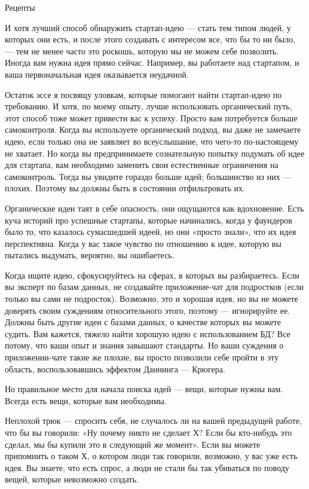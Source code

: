 \documentclass[ebook,12pt,oneside,openany]{memoir}
\begin{document}
Рецепты

И хотя лучший способ обнаружить стартап-идею — стать тем типом людей,
у которых они есть, и после этого создавать с интересом все, что бы то
ни было, — тем не менее часто это роскошь, которую мы не можем себе
позволить. Иногда вам нужна идея прямо сейчас. Например, вы работаете
над стартапом, и ваша первоначальная идея оказывается неудачной.

Остаток эссе я посвящу уловкам, которые помогают найти стартап-идею по
требованию. И хотя, по моему опыту, лучше использовать органический
путь, этот способ тоже может привести вас к успеху. Просто вам
потребуется больше самоконтроля. Когда вы используете органический
подход, вы даже не замечаете идею, если только она не заявляет во
всеуслышание, что чего-то по-настоящему не хватает. Но когда вы
предпринимаете сознательную попытку подумать об идее для стартапа, вам
необходимо заменить свои естественные ограничения на самоконтроль.
Тогда вы увидите гораздо больше идей; большинство из них — плохих.
Поэтому вы должны быть в состоянии отфильтровать их.

Органические идеи таят в себе опасность, они ощущаются как
вдохновение. Есть куча историй про успешные стартапы, которые
начинались, когда у фаундеров было то, что казалось сумасшедшей идеей,
но они «просто знали», что их идея перспективна. Когда у вас такое
чувство по отношению к идее, которую вы пытались выдумать, вероятно,
вы ошибаетесь.

Когда ищите идею, сфокусируйтесь на сферах, в которых вы разбираетесь.
Если вы эксперт по базам данных, не создавайте приложение-чат для
подростков (если только вы сами не подросток). Возможно, это и хорошая
идея, но вы не можете доверять своим суждениям относительного этого,
поэтому — игнорируйте ее. Должны быть другие идеи с базами данных, о
качестве которых вы можете судить. Вам кажется, тяжело найти хорошую
идею с использованием БД? Все потому, что ваши опыт и знания завышают
стандарты. Но ваши суждения о приложении-чате такие же плохие, вы
просто позволили себе пройти в эту область, воспользовавшись эффектом
Даннинга — Крюгера.

Но правильное место для начала поиска идей — вещи, которые нужны вам.
Всегда есть вещи, которые вам необходимы.

Неплохой трюк — спросить себя, не случалось ли на вашей предыдущей
работе, что бы вы говорили: «Ну почему никто не сделает Х? Если бы
кто-нибудь это сделал, мы бы купили это в следующий же момент». Если
вы можете припомнить о таком Х, о котором люди так говорили, возможно,
у вас уже есть идея. Вы знаете, что есть спрос, а люди не стали бы так
убиваться по поводу вещей, которые невозможно создать.
\end{document}
